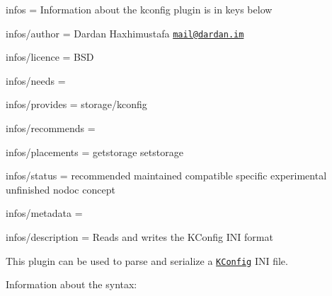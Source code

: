 
\begin{DoxyItemize}
\item infos = Information about the kconfig plugin is in keys below
\item infos/author = Dardan Haxhimustafa \href{mailto:mail@dardan.im}{\tt mail@dardan.\+im}
\item infos/licence = B\+SD
\item infos/needs =
\item infos/provides = storage/kconfig
\item infos/recommends =
\item infos/placements = getstorage setstorage
\item infos/status = recommended maintained compatible specific experimental unfinished nodoc concept
\item infos/metadata =
\item infos/description = Reads and writes the K\+Config I\+NI format
\end{DoxyItemize}

This plugin can be used to parse and serialize a \href{https://cgit.kde.org/kconfig.git}{\tt K\+Config} I\+NI file.

Information about the syntax\+:


